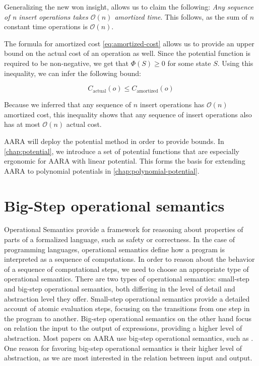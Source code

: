 Generalizing the new won insight, allows us to claim the following: \emph{Any sequence of n insert operations takes \(\mathcal{O}(n)\) amortized time}. This follows, as the sum of \(n\) constant time operations is \(\mathcal{O}(n)\). 

The formula for amortized cost \ref{eq:amortized-cost} allows us to provide an upper bound on the actual cost of an operation as well. Since the potential function is required to be non-negative, we get that \(\Phi(S) \geq 0\) for some state \(S\). Using this inequality, we can infer the following bound: 

\[C_{\text{actual}}(o) \leq C_{\text{amortized}}(o)\]
\label{ineq:actual-amortized}

Because we inferred that any sequence of \(n\) insert operations has \(\mathcal{O}(n)\) amortized cost, this inequality shows that any sequence of insert operations also has at most \(\mathcal{O}(n)\) actual cost.

AARA will deploy the potential method in order to provide bounds. In \ref{chap:potential}, we introduce a set of potential functions that are especially ergonomic for AARA with linear potential.
 This forms the basis for extending AARA to polynomial potentials in \ref{chap:polynomial-potential}.

\section{Big-Step operational semantics}
Operational Semantics provide a framework for reasoning about properties of parts of a formalized language, such as safety or correctness. In the case of programming languages, operational semantics define how a program is interpreted as a sequence of computations. In order to reason about the behavior of a sequence of computational steps, we need to choose an appropriate type of operational semantics.
There are two types of operational semantics: small-step and big-step operational semantics, both differing in the level of detail and abstraction level they offer. Small-step operational semantics provide a detailed account of atomic evaluation steps, focusing on the transitions from one step in the program to another. Big-step operational semantics on the other hand focus on relation the input to the output of expressions, providing a higher level of abstraction. Most papers on AARA use big-step operational semantics, such as . One reason for favoring big-step operational semantics is their higher level of abstraction, as we are most interested in the relation between input and output.

